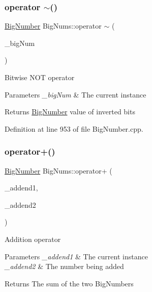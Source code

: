 \subsubsection{\texorpdfstring{operator $\sim$()}{operator ~()}}
{\footnotesize\ttfamily \mbox{\hyperlink{class_big_nums_1_1_big_number}{Big\+Number}} Big\+Nums\+::operator $\sim$ (\begin{DoxyParamCaption}\item[{const \mbox{\hyperlink{class_big_nums_1_1_big_number}{Big\+Number}} \&}]{\+\_\+big\+Num }\end{DoxyParamCaption})}

Bitwise N\+OT operator 
\begin{DoxyParams}{Parameters}
{\em \+\_\+big\+Num} & The current instance \\
\hline
\end{DoxyParams}
\begin{DoxyReturn}{Returns}
\mbox{\hyperlink{class_big_nums_1_1_big_number}{Big\+Number}} value of inverted bits 
\end{DoxyReturn}


Definition at line 953 of file Big\+Number.\+cpp.

\mbox{\label{namespace_big_nums_a43db6cb13170c6129a77c057ef76017e}} 
\subsubsection{\texorpdfstring{operator+()}{operator+()}}
{\footnotesize\ttfamily \mbox{\hyperlink{class_big_nums_1_1_big_number}{Big\+Number}} Big\+Nums\+::operator+ (\begin{DoxyParamCaption}\item[{\mbox{\hyperlink{class_big_nums_1_1_big_number}{Big\+Number}}}]{\+\_\+addend1,  }\item[{const \mbox{\hyperlink{class_big_nums_1_1_big_number}{Big\+Number}} \&}]{\+\_\+addend2 }\end{DoxyParamCaption})}

Addition operator 
\begin{DoxyParams}{Parameters}
{\em \+\_\+addend1} & The current instance \\
\hline
{\em \+\_\+addend2} & The number being added \\
\hline
\end{DoxyParams}
\begin{DoxyReturn}{Returns}
The sum of the two Big\+Numbers 
\end{DoxyReturn}


